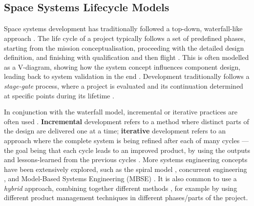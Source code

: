 \documentclass[]{iac}
\begin{document}
    \subsection{Space Systems Lifecycle Models}
    \paragraph{}
    Space systems development has traditionally followed a top-down, waterfall-like approach \autocite{shea_nasa_2017, ECSS-E-ST-10C}. The life cycle of a project typically follows a set of predefined phases, starting from the mission conceptualisation, proceeding with the detailed design definition, and finishing with qualification and then flight \autocite{aguirre_introduction_2013}. This is often modelled as a V-diagram, showing how the system concept influences component design, leading back to system validation in the end \autocite{clark_system_2009,bundesrepublik_deutschland_v-modell_2006}. Development traditionally follows a \textit{stage-gate} process, where a project is evaluated and its continuation determined at specific points during its lifetime \cite{carson_421_2013}.


    In conjunction with the waterfall model, incremental or iterative practices are often used \autocite{HEEAGER201822}. \textbf{Incremental} development refers to a method where distinct parts of the design are delivered one at a time; \textbf{iterative} development refers to an approach where the complete system is being refined after each of many cycles --- the goal being that each cycle leads to an improved product, by using the outputs and lessons-learned from the previous cycles \autocite{HEEAGER201822}. More systems engineering concepts have been extensively explored, such as the spiral model \autocite{nasa_engineering__safety_center_aligning_2018}, concurrent engineering \autocite{bandecchi_concurrent_1999}, and Model-Based Systems Engineering (MBSE) \autocite{fischer_implementing_2017}. It is also common to use a \textit{hybrid} approach, combining together different methods \autocite{carpenter_is_2014,garzaniti_toward_2020}, for example by using different product management techniques in different phases/parts of the project.
\end{document}
